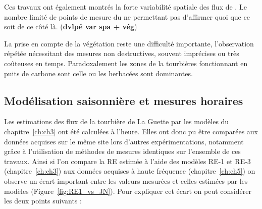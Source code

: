 Ces travaux ont également montrés la forte variabilité spatiale des flux de \coo.
Le nombre limité de points de mesure du \chh ne permettant pas d'affirmer quoi que ce soit de ce côté là.
(\textbf{dvlpé var spa + vég})



La prise en compte de la végétation reste une difficulté importante, l'observation répétée nécessitant des mesures non destructives, souvent imprécises ou très coûteuses en temps.
Paradoxalement les zones de la tourbières fonctionnant en puits de carbone sont celle ou les herbacées sont dominantes.

\subsection*{Modélisation saisonnière et mesures horaires}

Les estimations des flux de la tourbière de La Guette par les modèles du chapitre~\ref{ch:ch3} ont été calculées à l'heure.
Elles ont donc pu être comparées aux données acquises sur le même site lors d'autres expérimentations, notamment grâce à l'utilisation de méthodes de mesures identiques sur l'ensemble de ces travaux.
Ainsi si l'on compare la RE estimée à l'aide des modèles RE-1 et RE-3 (chapitre~\ref{ch:ch3}) aux données acquises à haute fréquence (chapitre~\ref{ch:ch5}) on observe un écart important entre les valeurs mesurées et celles estimées par les modèles (Figure~\ref{fig:RE1_vs_JN}).
Pour expliquer cet écart on peut considérer les deux points suivants : 

